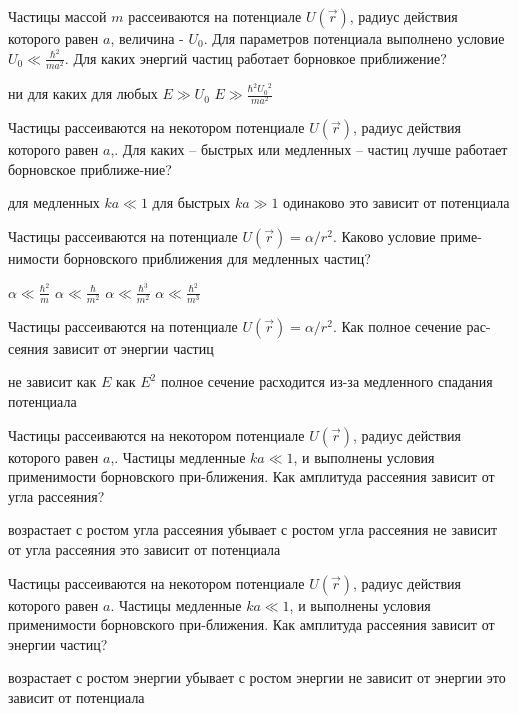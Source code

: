 \documentclass[11pt,a4paper]{exam}
\begin{document}
\begin{questions}
\question Частицы массой $m$ рассеиваются на потенциале $U(\vec r)$, радиус действия которого равен $a$, величина - ${U_0}$. Для параметров потенциала выполнено условие ${U_0} \ll \frac{{{\hbar ^2}}}{{m{a^2}}}$. Для каких энергий частиц работает борновкое приближение?
\begin{choices}
\choice ни для каких   
\choice для любых      
\choice $E \gg {U_0}$     
\choice $E \gg \frac{{{\hbar ^2}{U_0}^2}}{{m{a^2}}}$
\end{choices}

\question Частицы рассеиваются на некотором потенциале $U(\vec r)$, радиус действия которого равен $a$,. Для каких – быстрых или медленных – частиц лучше работает борновское приближе-ние?
\begin{choices}
\choice для медленных $ka \ll 1$
\choice для быстрых $ka \gg 1$
\choice одинаково
\choice это зависит от потенциала
\end{choices}

\question Частицы рассеиваются на потенциале $U(\vec r) = \alpha /{r^2}$. Каково условие приме-нимости борновского приближения для медленных частиц?
\begin{choices}
\choice $\alpha  \ll \frac{{{\hbar ^2}}}{m}$    
\choice $\alpha  \ll \frac{\hbar }{{{m^2}}}$    
\choice $\alpha  \ll \frac{{{\hbar ^3}}}{{{m^2}}}$    
\choice $\alpha  \ll \frac{{{\hbar ^2}}}{{{m^3}}}$
\end{choices}

\question Частицы рассеиваются на потенциале $U(\vec r) = \alpha /{r^2}$. Как полное сечение рас-сеяния зависит от энергии частиц
\begin{choices}
\choice не зависит     
\choice как $E$
\choice как ${E^2}$     
\choice полное сечение расходится из-за медленного спадания потенциала
\end{choices}

\question Частицы рассеиваются на некотором потенциале $U(\vec r)$, радиус действия которого равен $a$,. Частицы медленные $ka \ll 1$, и выполнены условия применимости борновского при-ближения. Как амплитуда рассеяния зависит от угла рассеяния?
\begin{choices}
\choice возрастает с ростом угла рассеяния     
\choice убывает с ростом угла рассеяния
\choice не зависит от угла рассеяния        
\choice это зависит от потенциала
\end{choices}

\question Частицы рассеиваются на некотором потенциале $U(\vec r)$, радиус действия которого равен $a$. Частицы медленные $ka \ll 1$, и выполнены условия применимости борновского при-ближения. Как амплитуда рассеяния зависит от энергии частиц?
\begin{choices}
\choice возрастает с ростом энергии         
\choice убывает с ростом энергии
\choice не зависит от энергии            
\choice это зависит от потенциала
\end{choices}


\end{questions}
\end{document}

